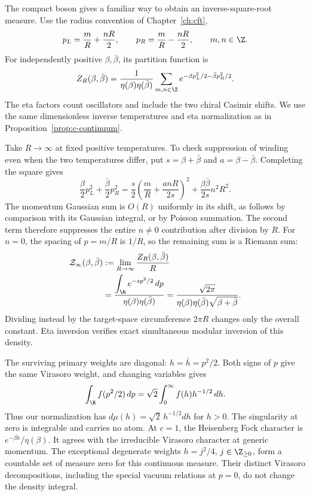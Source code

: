 \begin{example}
\label{ex:c-noncompact-boson}
The compact boson gives a familiar way to obtain an inverse-square-root
measure. Use the radius convention of Chapter~\ref{ch:cft},
\[
 p_L=\frac mR+\frac{nR}{2},\qquad
 p_R=\frac mR-\frac{nR}{2},\qquad m,n\in\Z.
\]
For independently positive $\beta,\bar\beta$, its partition function is
\[
 Z_R(\beta,\bar\beta)=
 \frac{1}{\eta(\beta)\eta(\bar\beta)}
 \sum_{m,n\in\Z}
 e^{-\beta p_L^2/2-\bar\beta p_R^2/2}.
\]
The eta factors count oscillators and include the two chiral Casimir
shifts. We use the same dimensionless inverse temperatures and eta
normalization as in Proposition~\ref{prop:c-continuum}.

Take $R\to\infty$ at fixed positive temperatures. To check suppression
of winding even when the two temperatures differ, put
$s=\beta+\bar\beta$ and $a=\beta-\bar\beta$. Completing the square gives
\[
 \frac\beta2p_L^2+\frac{\bar\beta}2p_R^2
 =\frac s2\left(\frac mR+\frac{anR}{2s}\right)^2
  +\frac{\beta\bar\beta}{2s}n^2R^2.
\]
The momentum Gaussian sum is $O(R)$ uniformly in its shift, as follows
by comparison with its Gaussian integral, or by Poisson summation.
The second term therefore suppresses the entire $n\ne0$ contribution
after division by $R$. For $n=0$, the spacing of $p=m/R$ is $1/R$,
so the remaining sum is a Riemann sum:
\begin{equation}
 \begin{split}
 \mathcal Z_\infty(\beta,\bar\beta)
 &:=\lim_{R\to\infty}\frac{Z_R(\beta,\bar\beta)}R\\
 &=\frac{\displaystyle\int_{\R}e^{-sp^2/2}\,dp}
         {\eta(\beta)\eta(\bar\beta)}
 =\frac{\sqrt{2\pi}}
         {\eta(\beta)\eta(\bar\beta)\sqrt{\beta+\bar\beta}}.
 \end{split}
 \label{eq:c-noncompact-density}
\end{equation}
Dividing instead by the target-space circumference $2\pi R$ changes
only the overall constant. Eta inversion verifies exact simultaneous
modular inversion of this density.

The surviving primary weights are diagonal:
$h=\bar h=p^2/2$. Both signs of $p$ give the same Virasoro weight,
and changing variables gives
\[
 \int_{\R} f(p^2/2)\,dp
 =\sqrt2\int_0^\infty f(h)h^{-1/2}\,dh.
\]
Thus our normalization has $d\mu(h)=\sqrt2\,h^{-1/2}dh$ for $h>0$.
The singularity at zero is integrable and carries no atom.
At $c=1$, the Heisenberg Fock character is
$e^{-\beta h}/\eta(\beta)$. It agrees with the irreducible Virasoro
character at generic momentum. The exceptional degenerate weights
$h=j^2/4$, $j\in\Z_{\ge0}$, form a countable set of measure zero
for this continuous measure. Their distinct Virasoro decompositions,
including the special vacuum relations at $p=0$, do not change the
density integral.


\end{example}
